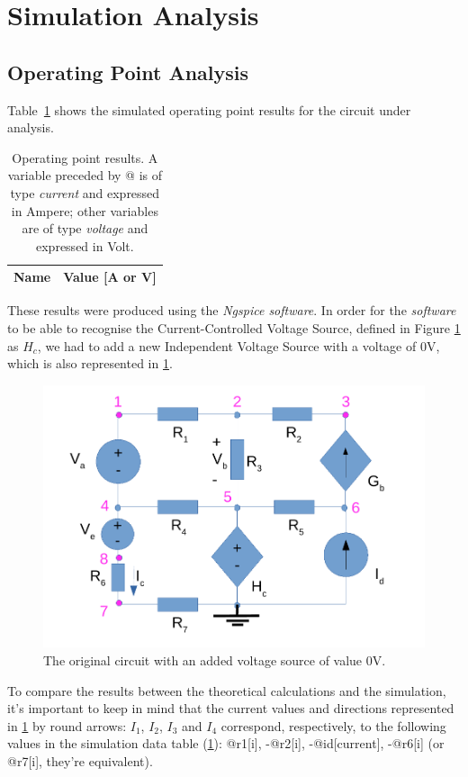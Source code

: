 \section{Simulation Analysis}
\label{sec:simulation}

\subsection{Operating Point Analysis}

Table~\ref{tab:op} shows the simulated operating point results for the circuit under analysis.

\begin{table}[htb!]
  \centering
  \begin{tabular}{|l|r|}
    \hline    
    {\bf Name} & {\bf Value [A or V]} \\ \hline
    
  \end{tabular}
  \caption{Operating point results. A variable preceded by @ is of type {\em current}
    and expressed in Ampere; other variables are of type {\it voltage} and expressed in
    Volt.}
  \label{tab:op}
\end{table}

These results were produced using the \textit{Ngspice software}. In order for the \textit{software} to be able to recognise the Current-Controlled Voltage Source, defined in Figure \ref{fig2} as $H_c$, we had to add a new Independent Voltage Source with a voltage of 0V, which is also represented in \ref{fig2}.


\begin{figure}[h] \centering
\includegraphics[width=0.4\linewidth]{t1-2.pdf}
\caption{The original circuit with an added voltage source of value 0V.}
\label{fig2}
\end{figure}


To compare the results between the theoretical calculations and the simulation, it's important to keep in mind that the current values and directions represented in \ref{fig2} by round arrows: $I_1$, $I_2$, $I_3$ and $I_4$ correspond, respectively, to the following values in the simulation data table (\ref{tab:op}): @r1[i], -@r2[i], -@id[current], -@r6[i] (or @r7[i], they're equivalent).


